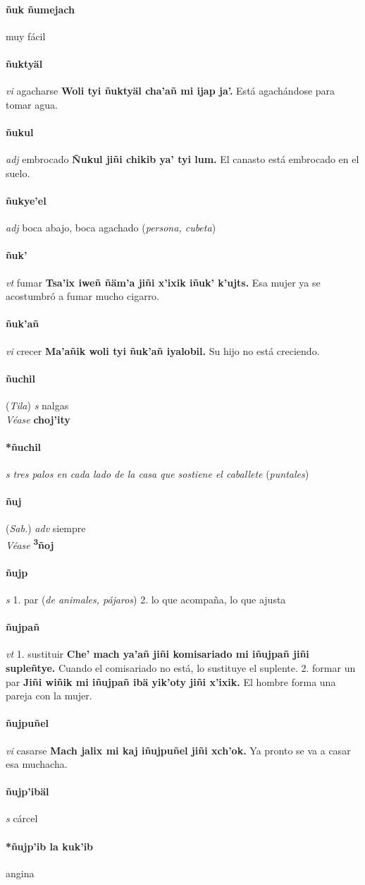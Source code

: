 \documentclass{scrbook}
\newcommand{\entry}[1]{\paragraph{#1}}
\newcommand{\onedefinition}[1]{#1.}
\newcommand{\nontranslationdef}[1]{\textit{#1}}
\newcommand{\partofspeech}[1]{\textit{#1}}
\newcommand{\spanishtranslation}[1]{#1}
\newcommand{\clarification}[1]{(\textit{#1})}
\newcommand{\cholexample}[1]{\textbf{#1}}
\newcommand{\exampletranslation}[1]{#1}
\newcommand{\alsosee}[1]{\\\textit{Véase} \textbf{#1}}
\newcommand{\relevantdialect}[1]{(\textit{#1})}
\begin{document}
\begin{multicols}{2}
\entry{ñuk ñumejach}
\spanishtranslation{muy fácil}

\entry{ñuktyäl}
\partofspeech{vi}
\spanishtranslation{agacharse}
\cholexample{Woli tyi ñuktyäl cha'añ mi ijap ja'.}
\exampletranslation{Está agachándose para tomar agua.}

\entry{ñukul}
\partofspeech{adj}
\spanishtranslation{embrocado}
\cholexample{Ñukul jiñi chikib ya' tyi lum.}
\exampletranslation{El canasto está embrocado en el suelo.}

\entry{ñukye'el}
\partofspeech{adj}
\spanishtranslation{boca abajo, boca agachado}
\clarification{persona, cubeta}

\entry{ñuk'}
\partofspeech{vt}
\spanishtranslation{fumar}
\cholexample{Tsa'ix iweñ ñäm'a jiñi x'ixik iñuk' k'ujts.}
\exampletranslation{Esa mujer ya se acostumbró a fumar mucho cigarro.}

\entry{ñuk'añ}
\partofspeech{vi}
\spanishtranslation{crecer}
\cholexample{Ma'añik woli tyi ñuk'añ iyalobil.}
\exampletranslation{Su hijo no está creciendo.}

\entry{ñuchil}
\relevantdialect{Tila}
\partofspeech{s}
\spanishtranslation{nalgas}
\alsosee{choj'ity}

\entry{*ñuchil}
\partofspeech{s}
\nontranslationdef{tres palos en cada lado de la casa que sostiene el caballete}
\clarification{puntales}

\entry{ñuj}
\relevantdialect{Sab.}
\partofspeech{adv}
\spanishtranslation{siempre}
\alsosee{\textsuperscript{3}ñoj}

\entry{ñujp}
\partofspeech{s}
\onedefinition{1}
\spanishtranslation{par}
\clarification{de animales, pájaros}
\onedefinition{2}
\spanishtranslation{lo que acompaña, lo que ajusta}

\entry{ñujpañ}
\partofspeech{vt}
\onedefinition{1}
\spanishtranslation{sustituir}
\cholexample{Che' mach ya'añ jiñi komisariado mi iñujpañ jiñi supleñtye.}
\exampletranslation{Cuando el comisariado no está, lo sustituye el suplente.}
\onedefinition{2}
\spanishtranslation{formar un par}
\cholexample{Jiñi wiñik mi iñujpañ ibä yik'oty jiñi x'ixik.}
\exampletranslation{El hombre forma una pareja con la mujer.}

\entry{ñujpuñel}
\partofspeech{vi}
\spanishtranslation{casarse}
\cholexample{Mach jalix mi kaj iñujpuñel jiñi xch'ok.}
\exampletranslation{Ya pronto se va a casar esa muchacha.}

\entry{ñujp'ibäl}
\partofspeech{s}
\spanishtranslation{cárcel}

\entry{*ñujp'ib la kuk'ib}
\spanishtranslation{angina}


\end{multicols}
\end{document}
